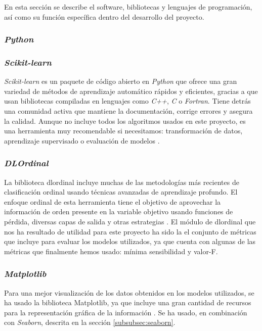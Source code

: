 En esta sección se describe el software, bibliotecas y lenguajes de programación, así como su función específica dentro del desarrollo del proyecto.

\subsubsection{\textit{Python}}
\label{subsubsec:python}



\subsubsection{\textit{Scikit-learn}}
\label{subsubsec:sklearn}

\textit{Scikit-learn} es un paquete de código abierto en \textit{Python} que ofrece una gran variedad de métodos de aprendizaje automático rápidos y eficientes, gracias a que usan bibliotecas compiladas en lenguajes como \textit{C++}, \textit{C} o \textit{Fortran}. Tiene detrás una comunidad activa que mantiene la documentación, corrige errores y asegura la calidad. Aunque no incluye todos los algoritmos usados en este proyecto, es una herramienta muy recomendable si necesitamos: transformación de datos, aprendizaje supervisado o evaluación de modelos \cite{hao2019scikit}.

\subsubsection{\textit{DLOrdinal}}
\label{subsubsec:dlordinal}

La biblioteca dlordinal incluye muchas de las metodologías más recientes de clasificación ordinal usando técnicas avanzadas de aprendizaje profundo. El enfoque ordinal de esta herramienta tiene el objetivo de aprovechar la información de orden presente en la variable objetivo usando funciones de pérdida, diversas capas de salida y otras estrategias \cite{dlordinal}. El módulo de dlordinal que nos ha resultado de utilidad para este proyecto ha sido la el conjunto de métricas que incluye para evaluar los modelos utilizados, ya que cuenta con algunas de las métricas que finalmente hemos usado: mínima sensibilidad y valor-F.

\subsubsection{\textit{Matplotlib}}
\label{subsubsec:matplotlib}

Para una mejor visualización de los datos obtenidos en los modelos utilizados, se ha usado la biblioteca Matplotlib, ya que incluye una gran cantidad de recursos para la representación gráfica de la información \cite{matplotlib}. Se ha usado, en combinación con \textit{Seaborn}, descrita en la sección \ref{subsubsec:seaborn}.

